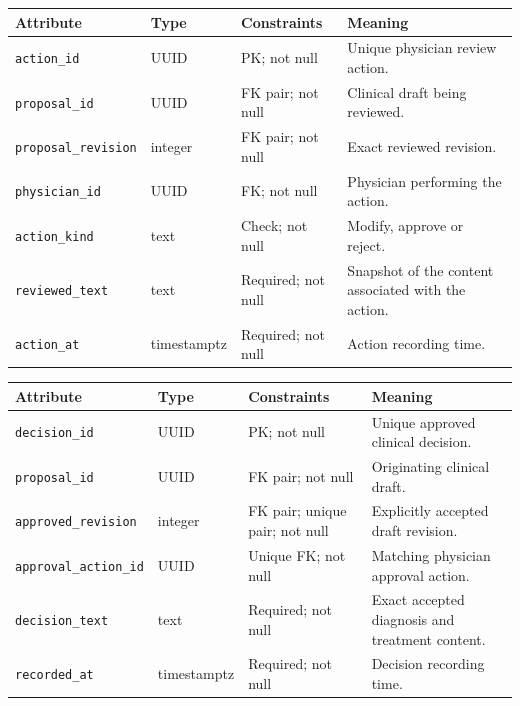 \begin{reporttable}
\setlength{\tabcolsep}{5pt}
\centering
\small
\caption{PhysicianAction attributes, types and constraints.}
\label{tab:kashaf:dict-physicianaction}
\begin{tabular}{|p{}|p{}|p{}|p{}|}
\hline
Attribute & Type & Constraints & Meaning \\ \hline
\texttt{action\_id} & UUID & PK; not null & Unique physician review action. \\ \hline
\texttt{proposal\_id} & UUID & FK pair; not null & Clinical draft being reviewed. \\ \hline
\texttt{proposal\_revision} & integer & FK pair; not null & Exact reviewed revision. \\ \hline
\texttt{physician\_id} & UUID & FK; not null & Physician performing the action. \\ \hline
\texttt{action\_kind} & text & Check; not null & Modify, approve or reject. \\ \hline
\texttt{reviewed\_text} & text & Required; not null & Snapshot of the content associated with the action. \\ \hline
\texttt{action\_at} & timestamptz & Required; not null & Action recording time. \\ \hline
\end{tabular}
\end{reporttable}

\begin{reporttable}
\setlength{\tabcolsep}{5pt}
\centering
\small
\caption{ClinicalDecision attributes, types and constraints.}
\label{tab:kashaf:dict-clinicaldecision}
\begin{tabular}{|p{}|p{}|p{}|p{}|}
\hline
Attribute & Type & Constraints & Meaning \\ \hline
\texttt{decision\_id} & UUID & PK; not null & Unique approved clinical decision. \\ \hline
\texttt{proposal\_id} & UUID & FK pair; not null & Originating clinical draft. \\ \hline
\texttt{approved\_revision} & integer & FK pair; unique pair; not null & Explicitly accepted draft revision. \\ \hline
\texttt{approval\_action\_id} & UUID & Unique FK; not null & Matching physician approval action. \\ \hline
\texttt{decision\_text} & text & Required; not null & Exact accepted diagnosis and treatment content. \\ \hline
\texttt{recorded\_at} & timestamptz & Required; not null & Decision recording time. \\ \hline
\end{tabular}
\end{reporttable}

